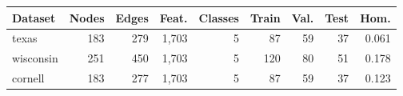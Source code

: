 \begin{tabular}{lrrrrrrrr}
\toprule
Dataset & Nodes & Edges & Feat. & Classes & Train & Val. & Test & Hom. \\
\midrule
texas & 183 & 279 & 1,703 & 5 & 87 & 59 & 37 & 0.061 \\
wisconsin & 251 & 450 & 1,703 & 5 & 120 & 80 & 51 & 0.178 \\
cornell & 183 & 277 & 1,703 & 5 & 87 & 59 & 37 & 0.123 \\
\bottomrule
\end{tabular}

